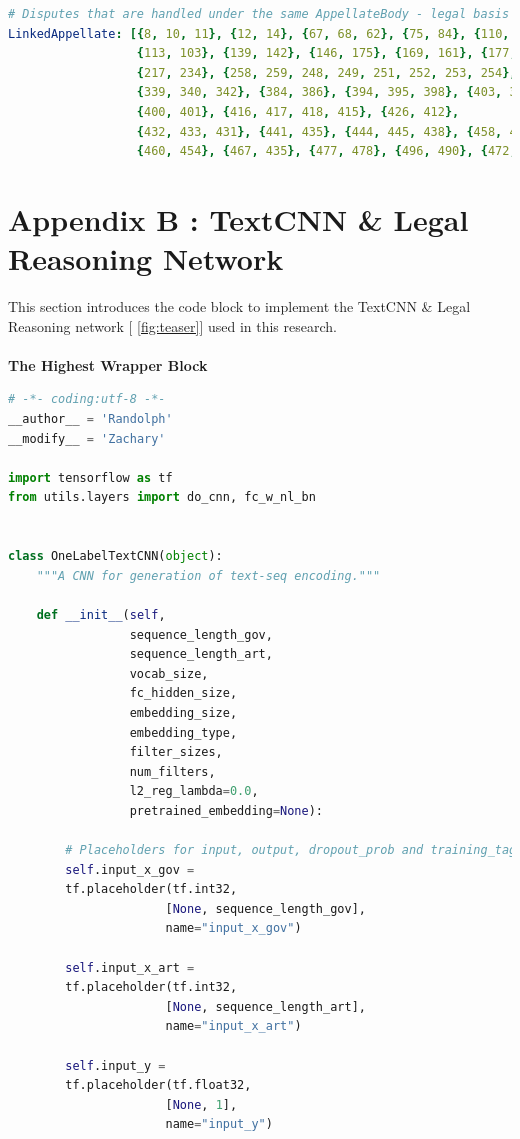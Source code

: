 \documentclass[sigconf]{acmart}
\begin{document}
\begin{appendices}
\begin{lstlisting}[breaklines, language=yaml, frame=tlrb]
# Disputes that are handled under the same AppellateBody - legal basis refers to the DSU Art.9.1
LinkedAppellate: [{8, 10, 11}, {12, 14}, {67, 68, 62}, {75, 84}, {110, 87},
                  {113, 103}, {139, 142}, {146, 175}, {169, 161}, {177,178},
                  {217, 234}, {258, 259, 248, 249, 251, 252, 253, 254},
                  {339, 340, 342}, {384, 386}, {394, 395, 398}, {403, 396},
                  {400, 401}, {416, 417, 418, 415}, {426, 412},
                  {432, 433, 431}, {441, 435}, {444, 445, 438}, {458, 435},
                  {460, 454}, {467, 435}, {477, 478}, {496, 490}, {472, 497}]

\end{lstlisting}


\section*{Appendix  B : TextCNN & Legal Reasoning Network \label{codeblock_model}} This section introduces the code block to implement the TextCNN \& Legal Reasoning network [ \ref{fig:teaser}] used in this research.\\\\
\textbf{The Highest Wrapper Block}
\begin{lstlisting}[breaklines, language=Python, frame=tlrb]
# -*- coding:utf-8 -*-
__author__ = 'Randolph'
__modify__ = 'Zachary'

import tensorflow as tf
from utils.layers import do_cnn, fc_w_nl_bn


class OneLabelTextCNN(object):
    """A CNN for generation of text-seq encoding."""

    def __init__(self,
                 sequence_length_gov,
                 sequence_length_art,
                 vocab_size,
                 fc_hidden_size,
                 embedding_size,
                 embedding_type,
                 filter_sizes,
                 num_filters,
                 l2_reg_lambda=0.0,
                 pretrained_embedding=None):

        # Placeholders for input, output, dropout_prob and training_tag
        self.input_x_gov = 
        tf.placeholder(tf.int32,
                      [None, sequence_length_gov],
                      name="input_x_gov")

        self.input_x_art = 
        tf.placeholder(tf.int32,
                      [None, sequence_length_art],
                      name="input_x_art")

        self.input_y = 
        tf.placeholder(tf.float32,
                      [None, 1],
                      name="input_y")


\end{lstlisting}
\end{appendices}
\end{document}
